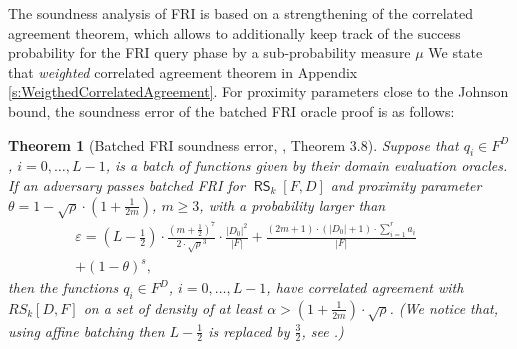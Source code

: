 \documentclass[11pt,article,oneside]{memoir}
\newtheorem{thm}{Theorem}[]
\newtheorem{prop}[]{Proposition}
\theoremstyle{definition}
\theoremstyle{remark}
\DeclareMathOperator{\RS}{\mathsf{RS}}
\begin{document}
%

The soundness analysis of FRI is based on a strengthening of the correlated agreement theorem, which allows to additionally keep track of the success probability for the FRI query phase by a sub-probability measure $\mu$
We state that \textit{weighted} correlated agreement theorem in Appendix \ref{s:WeigthedCorrelatedAgreement}.
For proximity parameters close to the Johnson bound, the soundness error of the batched FRI oracle proof is as follows:

\begin{thm}[Batched FRI soundness error, \cite{ProximityGaps}, Theorem 3.8]
Suppose that $q_i\in F^D$, $i=0,\ldots,L-1$, is a batch of functions given by their domain evaluation oracles.
 If an adversary passes batched FRI for $\RS_k[F,D]$ and proximity parameter $\theta =1-\sqrt\rho \cdot \left(1+\frac{1}{2m}\right)$, $m\geq 3$, with a probability larger than
\begin{equation}
\label{e:EpsilonFRI}
\begin{aligned} 
\varepsilon = \left(L-\frac{1}{2}\right) \cdot \frac {\left(m+ \frac{1}{2}\right)^7}{2\cdot\sqrt\rho^3}\cdot \frac{|D_0|^2}{|F|} 
+ \frac{(2m+1)\cdot (|D_0|+1)\cdot \sum_{i=1}^{r} a_i}{|F|} \quad\quad
\\
+(1-\theta)^s ,
\end{aligned}
\end{equation}
 then the functions $q_i\in F^D$, $i=0,\ldots,L-1$, have correlated agreement with $RS_k[D,F]$ on a set of density of at least $\alpha >\left(1+\frac{1}{2m}\right)\cdot \sqrt\rho$.
(We notice that, using affine batching then $L-\frac{1}{2}$ is replaced by $\frac{3}{2}$, see \cite{ProximityGaps}.)
\end{thm}
\end{document}

